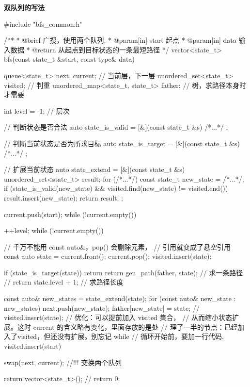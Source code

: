 \textbf{双队列的写法}
\begin{Codex}[label=bfs_template1.cpp]
#include "bfs_common.h"

/**
 * @brief 广搜，使用两个队列.
 * @param[in] start 起点
 * @param[in] data 输入数据
 * @return 从起点到目标状态的一条最短路径
 */
vector<state_t> bfs(const state_t &start, const type& data) {
    queue<state_t> next, current; // 当前层，下一层
    unordered_set<state_t> visited; // 判重
    unordered_map<state_t, state_t> father; // 树，求路径本身时才需要

    int level = -1;  // 层次

    // 判断状态是否合法
    auto state_is_valid = [&](const state_t &s) { /*...*/ };

    // 判断当前状态是否为所求目标
    auto state_is_target = [&](const state_t &s) { /*...*/ };

    // 扩展当前状态
    auto state_extend = [&](const state_t &s) {
        unordered_set<state_t> result;
        for (/*...*/) {
            const state_t new_state = /*...*/;
            if (state_is_valid(new_state) && 
                    visited.find(new_state) != visited.end()) {
                result.insert(new_state);
            }
        }
        return result;
    };

    current.push(start);
    while (!current.empty()) {
        ++level;
        while (!current.empty()) {
            // 千万不能用 const auto&，pop() 会删除元素，
            // 引用就变成了悬空引用
            const auto state = current.front();
            current.pop();
            visited.insert(state);

            if (state_is_target(state)) {
                return return gen_path(father, state); // 求一条路径
                // return state.level + 1; // 求路径长度
            }

            const auto& new_states = state_extend(state);
            for (const auto& new_state : new_states) {
                next.push(new_state);
                father[new_state] = state;
                // visited.insert(state); // 优化：可以提前加入 visited 集合，
                // 从而缩小状态扩展。这时 current 的含义略有变化，里面存放的是处
                // 理了一半的节点：已经加入了visited，但还没有扩展。别忘记 while
                // 循环开始前，要加一行代码, visited.insert(start)
            }
        }
        swap(next, current); //!!! 交换两个队列
    }

    return vector<state_t>();
    // return 0;
}
\end{Codex}


